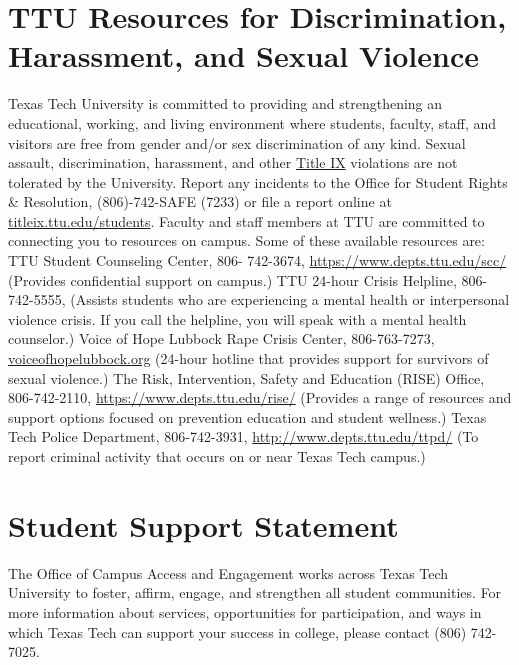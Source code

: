 \documentclass[12pt, notitlepage]{article}   	%
\begin{document}
{\section{TTU Resources for Discrimination, Harassment, and Sexual Violence}
Texas Tech University is committed to providing and strengthening an
educational, working, and living environment where students, faculty, staff,
and visitors are free from gender and/or sex discrimination of any kind.
Sexual assault, discrimination, harassment, and other \href{https://www.depts.ttu.edu/titleix/}{Title IX}
violations are not tolerated by the University. Report any incidents to the
Office for Student Rights & Resolution, (806)-742-SAFE (7233) or file a
report online at \url{titleix.ttu.edu/students}. Faculty and staff members at TTU
are committed to connecting you to resources on campus. Some of these
available resources are: TTU Student Counseling Center, 806- 742-3674,
\url{https://www.depts.ttu.edu/scc/} (Provides confidential support on
campus.) TTU 24-hour Crisis Helpline, 806-742-5555, (Assists students
who are experiencing a mental health or interpersonal violence crisis. If you
call the helpline, you will speak with a mental health counselor.) Voice of
Hope Lubbock Rape Crisis Center, 806-763-7273,
\url{voiceofhopelubbock.org} (24-hour hotline that provides support for
survivors of sexual violence.) The Risk, Intervention, Safety and Education
(RISE) Office, 806-742-2110, \url{https://www.depts.ttu.edu/rise/} (Provides a
range of resources and support options focused on prevention education
and student wellness.) Texas Tech Police Department, 806-742-3931,
\url{http://www.depts.ttu.edu/ttpd/} (To report criminal activity that occurs on
or near Texas Tech campus.)

\section{Student Support Statement}
The Office of Campus Access and Engagement works across Texas Tech
University to foster, affirm, engage, and strengthen all student
communities. For more information about services, opportunities for
participation, and ways in which Texas Tech can support your success in
college, please contact (806) 742-7025.

}
\end{document}
